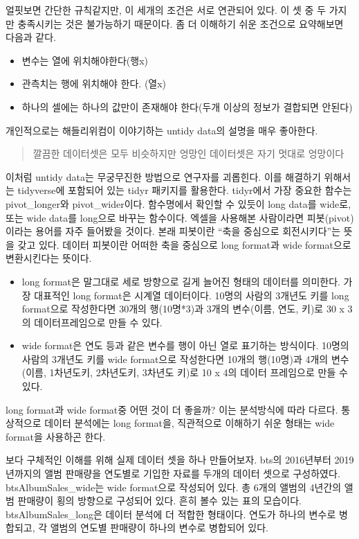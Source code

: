 \documentclass[
]{book}
\providecommand{\tightlist}{%
  \setlength{\itemsep}{0pt}\setlength{\parskip}{0pt}}
\begin{document}
얼핏보면 간단한 규칙같지만, 이 세개의 조건은 서로 연관되어 있다. 이 셋 중 두 가지만 충족시키는 것은 불가능하기 때문이다. 좀 더 이해하기 쉬운 조건으로 요약해보면 다음과 같다.

\begin{itemize}
\tightlist
\item
  변수는 열에 위치해야한다(행x)
\item
  관측치는 행에 위치해야 한다. (열x)
\item
  하나의 셀에는 하나의 값만이 존재해야 한다(두개 이상의 정보가 결합되면 안된다)
\end{itemize}

개인적으로는 해들리위컴이 이야기하는 untidy data의 설명을 매우 좋아한다.

\begin{quote}
깔끔한 데이터셋은 모두 비슷하지만 엉망인 데이터셋은 자기 멋대로 엉망이다
\end{quote}

이처럼 untidy data는 무궁무진한 방법으로 연구자를 괴롭힌다. 이를 해결하기 위해서는 tidyverse에 포함되어 있는 tidyr 패키지를 활용한다. tidyr에서 가장 중요한 함수는 pivot\_longer와 pivot\_wider이다. 함수명에서 확인할 수 있듯이 long data를 wide로, 또는 wide data를 long으로 바꾸는 함수이다.
엑셀을 사용해본 사람이라면 피봇(pivot)이라는 용어를 자주 들어봤을 것이다. 본래 피봇이란 ``축을 중심으로 회전시키다''는 뜻을 갖고 있다. 데이터 피봇이란 어떠한 축을 중심으로 long format과 wide format으로 변환시킨다는 뜻이다.

\begin{itemize}
\item
  long format은 말그대로 세로 방향으로 길게 늘어진 형태의 데이터를 의미한다. 가장 대표적인 long format은 시계열 데이터이다. 10명의 사람의 3개년도 키를 long format으로 작성한다면 30개의 행(10명*3)과 3개의 변수(이름, 연도, 키)로 30 x 3의 데이터프레임으로 만들 수 있다.
\item
  wide format은 연도 등과 같은 변수를 행이 아닌 열로 표기하는 방식이다. 10명의 사람의 3개년도 키를 wide format으로 작성한다면 10개의 행(10명)과 4개의 변수(이름, 1차년도키, 2차년도키, 3차년도 키)로 10 x 4의 데이터 프레임으로 만들 수 있다.
\end{itemize}

long format과 wide format중 어떤 것이 더 좋을까? 이는 분석방식에 따라 다르다. 통상적으로 데이터 분석에는 long format을, 직관적으로 이해하기 쉬운 형태는 wide format을 사용하곤 한다.

보다 구체적인 이해를 위해 실제 데이터 셋을 하나 만들어보자. bts의 2016년부터 2019년까지의 앨범 판매량을 연도별로 기입한 자료를 두개의 데이터 셋으로 구성하였다. btsAlbumSales\_wide는 wide format으로 작성되어 있다. 총 6개의 앨범의 4년간의 앨범 판매량이 횡의 방향으로 구성되어 있다. 흔히 볼수 있는 표의 모습이다. btsAlbumSales\_long은 데이터 분석에 더 적합한 형태이다. 연도가 하나의 변수로 병합되고, 각 앨범의 연도별 판매량이 하나의 변수로 병합되어 있다.
\end{document}

